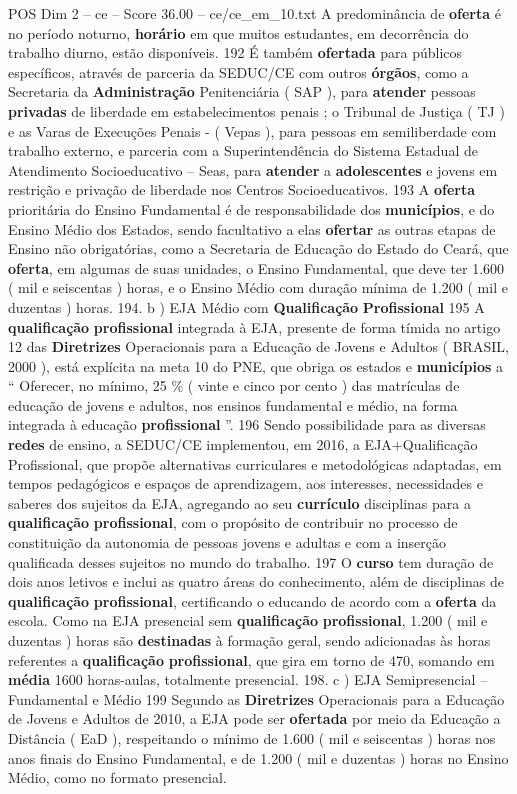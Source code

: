 \begin{textsample}{POS Dim 2 – ce – Score 36.00 – ce/ce\_em\_10.txt}
A predominância de \textbf{oferta} é no período noturno, \textbf{horário} em que muitos estudantes, em decorrência do trabalho diurno, estão disponíveis. 192 É também \textbf{ofertada} para públicos específicos, através de parceria da SEDUC/CE com outros \textbf{órgãos}, como a Secretaria da \textbf{Administração} Penitenciária ( SAP ), para \textbf{atender} pessoas \textbf{privadas} de liberdade em estabelecimentos penais ; o Tribunal de Justiça ( TJ ) e as Varas de Execuções Penais - ( Vepas ), para pessoas em semiliberdade com trabalho externo, e parceria com a Superintendência do Sistema Estadual de Atendimento Socioeducativo – Seas, para \textbf{atender} a \textbf{adolescentes} e jovens em restrição e privação de liberdade nos Centros Socioeducativos. 193 A \textbf{oferta} prioritária do Ensino Fundamental é de responsabilidade dos \textbf{municípios}, e do Ensino Médio dos Estados, sendo facultativo a elas \textbf{ofertar} as outras etapas de Ensino não obrigatórias, como a Secretaria de Educação do Estado do Ceará, que \textbf{oferta}, em algumas de suas unidades, o Ensino Fundamental, que deve ter 1.600 ( mil e seiscentas ) horas, e o Ensino Médio com duração mínima de 1.200 ( mil e duzentas ) horas. 194. b ) EJA Médio com \textbf{Qualificação} \textbf{Profissional} 195 A \textbf{qualificação} \textbf{profissional} integrada à EJA, presente de forma tímida no artigo 12 das \textbf{Diretrizes} Operacionais para a Educação de Jovens e Adultos ( BRASIL, 2000 ), está explícita na meta 10 do PNE, que obriga os estados e \textbf{municípios} a “ Oferecer, no mínimo, 25 \% ( vinte e cinco por cento ) das matrículas de educação de jovens e adultos, nos ensinos fundamental e médio, na forma integrada à educação \textbf{profissional} ”. 196 Sendo possibilidade para as diversas \textbf{redes} de ensino, a SEDUC/CE implementou, em 2016, a EJA+Qualificação Profissional, que propõe alternativas curriculares e metodológicas adaptadas, em tempos pedagógicos e espaços de aprendizagem, aos interesses, necessidades e saberes dos sujeitos da EJA, agregando ao seu \textbf{currículo} disciplinas para a \textbf{qualificação} \textbf{profissional}, com o propósito de contribuir no processo de constituição da autonomia de pessoas jovens e adultas e com a inserção qualificada desses sujeitos no mundo do trabalho. 197 O \textbf{curso} tem duração de dois anos letivos e inclui as quatro áreas do conhecimento, além de disciplinas de \textbf{qualificação} \textbf{profissional}, certificando o educando de acordo com a \textbf{oferta} da escola.
Como na EJA presencial sem \textbf{qualificação} \textbf{profissional}, 1.200 ( mil e duzentas ) horas são \textbf{destinadas} à formação geral, sendo adicionadas às horas referentes a \textbf{qualificação} \textbf{profissional}, que gira em torno de 470, somando em \textbf{média} 1600 horas-aulas, totalmente presencial. 198. c ) EJA Semipresencial – Fundamental e Médio 199 Segundo as \textbf{Diretrizes} Operacionais para a Educação de Jovens e Adultos de 2010, a EJA pode ser \textbf{ofertada} por meio da Educação a Distância ( EaD ), respeitando o mínimo de 1.600 ( mil e seiscentas ) horas nos anos finais do Ensino Fundamental, e de 1.200 ( mil e duzentas ) horas no Ensino Médio, como no formato presencial.

\end{textsample}
